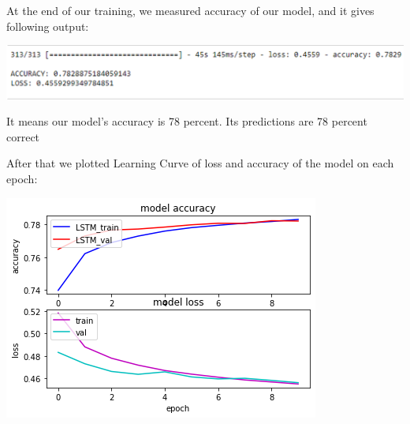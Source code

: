 At the end of our training, we measured accuracy of our model, and it gives following output:
\begin{center}
\includegraphics[scale=0.52]{testing.png}
\end{center}


It means our model's accuracy is 78 percent. Its predictions are 78 percent correct
	\vspace*{0.8cm}


After that we plotted Learning Curve of loss and accuracy of the model on each epoch:
\begin{center}
\includegraphics[scale=0.88]{graph.png}
\end{center}

